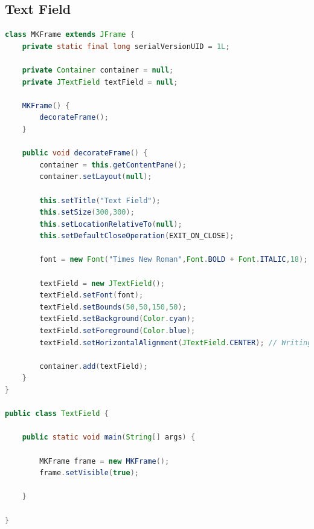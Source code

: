 \newpage
\subsection{Text Field}

\begin{frame}

\begin{lstlisting}[language=java]
class MKFrame extends JFrame {
	private static final long serialVersionUID = 1L;
	
	private Container container = null;
	private JTextField textField = null;
	
	MKFrame() {
		decorateFrame();		
	}
	
	public void decorateFrame() {
		container = this.getContentPane();
		container.setLayout(null);
		
		this.setTitle("Text Field");
		this.setSize(300,300);
		this.setLocationRelativeTo(null);
		this.setDefaultCloseOperation(EXIT_ON_CLOSE);
		
		font = new Font("Times New Roman",Font.BOLD + Font.ITALIC,18);
		
		textField = new JTextField();
		textField.setFont(font);
		textField.setBounds(50,50,150,50);
		textField.setBackground(Color.cyan);
		textField.setForeground(Color.blue);
		textField.setHorizontalAlignment(JTextField.CENTER); // Writing start form center
		
		container.add(textField);
	}
}

public class TextField {

	public static void main(String[] args) {
		
		MKFrame frame = new MKFrame();
		frame.setVisible(true);

	}

}
\end{lstlisting}


\end{frame}


